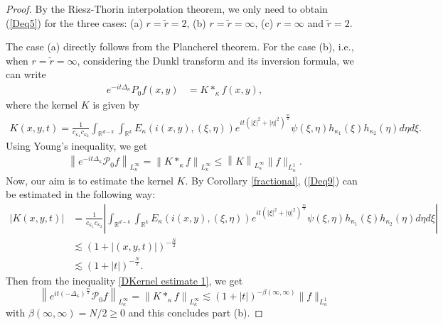 \documentclass[a4paper,11pt, reqno]{amsart}
\theoremstyle{definition}
\theoremstyle{remark}
\numberwithin{equation}{section}
\newcommand{\K}{\kappa }
\begin{document}
	\begin{proof}
		By the Riesz-Thorin interpolation theorem, we only need to obtain (\ref{Deq5}) for the  three cases:
		(a) $r=\widetilde{r}=2$,
		(b) $r=\widetilde{r}=\infty$,
		(c) $r=\infty$ and $\tilde{r}=2$.
		
		
		The case (a) directly follows from the Plancherel theorem. For the case (b), i.e., when  $r=\widetilde{r}=\infty$,  considering the Dunkl transform and its inversion formula, we can write
		$$
		\begin{aligned}
			e^{-i t \Delta_\kappa} P_0 f(x, y) %
			& =K*_{\kappa} f(x, y),
		\end{aligned}
		$$
		where the kernel $K$ is given by 
		\begin{align}\label{Deq9}
			K(x, y, t)=\frac{1}{{c_{\K_1}c_{\K_2}}} \int_{\mathbb{R}^{d-k}} \int_{\mathbb{R}^k} E_{\kappa}(i(x,y), (\xi, \eta))e^{ it (|\xi|^2+ |\eta|^2)^{\frac{m}{2}}} \psi(\xi, \eta)h_{\kappa_1}(\xi) h_{\kappa_2}(\eta) d \eta d \xi.
		\end{align}
		Using  Young's inequality, we get
		\begin{align}\label{DKernel estimate 1}
			\left\|e^{-i t\Delta_\kappa} \mathcal{P}_0f\right\|_{L_{\kappa}^{\infty}}=\left\|K*_{\kappa} f\right\|_{L_{\kappa}^{\infty}} \leq\left\|K\right\|_{L_{\kappa}^{\infty}}\|f\|_{L_{\kappa}^1} .
		\end{align}
		Now, our aim is to estimate the kernel $K$.  By  Corollary \ref{fractional},    (\ref{Deq9})  can be estimated in the following way:
		\begin{align}\label{oscillatory}\nonumber
			\left|K(x, y, t)\right| & =\frac{1}{{ c_{\K_1}c_{\K_2}}} \left|\int_{\mathbb{R}^{d-k}} \int_{\mathbb{R}^k} E_{\kappa}(i(x,y), (\xi, \eta))e^{i t (|\xi|^2+ |\eta|^2)^{\frac{m}{2}}} \psi(\xi, \eta)h_{\kappa_1}(\xi) h_{\kappa_2}(\eta)  d \eta d \xi \right| \\\nonumber
			& \lesssim(1+|(x, y, t)|)^{-\frac{N}{2}} \\
			& \lesssim(1+|t|)^{-\frac{N}{2}}.
		\end{align}
		Then from the inequality \eqref{DKernel estimate 1}, we get 
		$$		\left\|e^{i t(-\Delta_\kappa)^{\frac{m}{2}}} \mathcal{P}_0 f\right\|_{L_{\kappa}^{\infty}}=\left\|K*_{\kappa} f\right\|_{L_{\kappa}^{\infty}}   \lesssim(1+|t|)^{-\beta(\infty, \infty)} \|f\|_{L_{\kappa}^1} $$
		with $ \beta(\infty, \infty)=N/ 2 \geq 0$ and   this concludes part (b). 
		

\end{proof}
\end{document}
